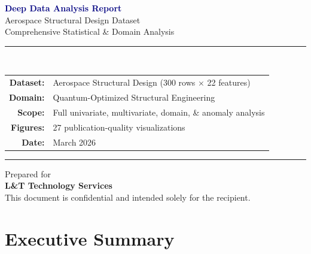 \documentclass[11pt, a4paper]{report}
\begin{document}
\begin{titlepage}
\begin{center}
\vspace*{2cm}

{\Huge\bfseries\textcolor{navy}{Deep Data Analysis Report}}\\[0.8cm]
{\Large\textcolor{slate}{Aerospace Structural Design Dataset}}\\[0.3cm]
{\large\textcolor{slate}{Comprehensive Statistical \& Domain Analysis}}

\vspace{1.5cm}

\rule{0.6\textwidth}{1.5pt}\\[0.5cm]

{\large
\begin{tabular}{rl}
\textbf{Dataset:} & Aerospace Structural Design (300 rows $\times$ 22 features) \\[4pt]
\textbf{Domain:} & Quantum-Optimized Structural Engineering \\[4pt]
\textbf{Scope:} & Full univariate, multivariate, domain, \& anomaly analysis \\[4pt]
\textbf{Figures:} & 27 publication-quality visualizations \\[4pt]
\textbf{Date:} & March 2026 \\
\end{tabular}
}

\vspace{1.5cm}
\rule{0.6\textwidth}{1.5pt}

\vspace{2cm}

{\large Prepared for}\\[0.3cm]
{\Large\bfseries L\&T Technology Services}\\[1cm]

{\footnotesize\textcolor{slate}{This document is confidential and intended solely for the recipient.}}
\end{center}
\end{titlepage}

\tableofcontents
\newpage

\chapter{Executive Summary}
\end{document}
